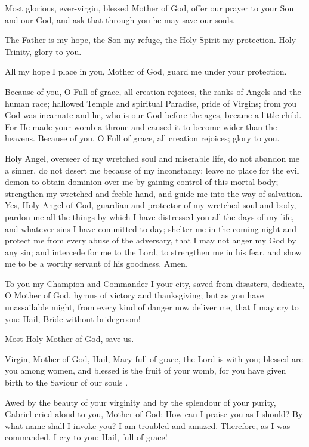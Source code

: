 
Most glorious, ever-virgin, blessed Mother of God, offer our prayer to your Son and our God,
and ask that through you he may save our souls.


The Father is my hope, the Son my refuge, the Holy Spirit my protection. Holy Trinity, glory to you.


All my hope I place in you, Mother of God, guard me under your protection.

Because of you, O Full of grace, all creation rejoices, the ranks of Angels and the human race;
hallowed Temple and spiritual Paradise, pride of Virgins;
from you God was incarnate and he, who is our God before the ages, became a little child.
For He made your womb a throne and caused it to become wider than the heavens.
Because of you, O Full of grace, all creation rejoices; glory to you.


Holy Angel, overseer of my wretched soul and miserable life, do not abandon me a sinner,
do not desert me because of my inconstancy;
leave no place for the evil demon to obtain dominion over me by gaining control of this mortal body;
strengthen my wretched and feeble hand, and guide me into the way of salvation.
Yes, Holy Angel of God, guardian and protector of my wretched soul and body,
pardon me all the things by which I have distressed you all the days of my life,
and whatever sins I have committed to-day; 
shelter me in the coming night and protect me from every abuse of the adversary,
that I may not anger my God by any sin; and intercede for me to the Lord,
to strengthen me in his fear, and show me to be a worthy servant of his goodness. Amen.


To you my Champion and Commander I your city, saved from disasters, dedicate,
O Mother of God, hymns of victory and thanksgiving; but as you have unassailable might,
from every kind of danger now deliver me, that I may cry to you: Hail, Bride without bridegroom!

Most Holy Mother of God, save us.


Virgin, Mother of God, Hail, Mary full of grace, the Lord is with you;
blessed are you among women, and blessed is the fruit of your womb,
for you have given birth to the Saviour of our souls .


\glorybothnow



Awed by the beauty of your virginity and by the splendour of your purity,
Gabriel cried aloud to you, Mother of God: 
How can I praise you as I should? By what name shall I invoke you? I am troubled and amazed.
Therefore, as I was commanded, I cry to you: Hail, full of grace!\\

\throughtheprayers

